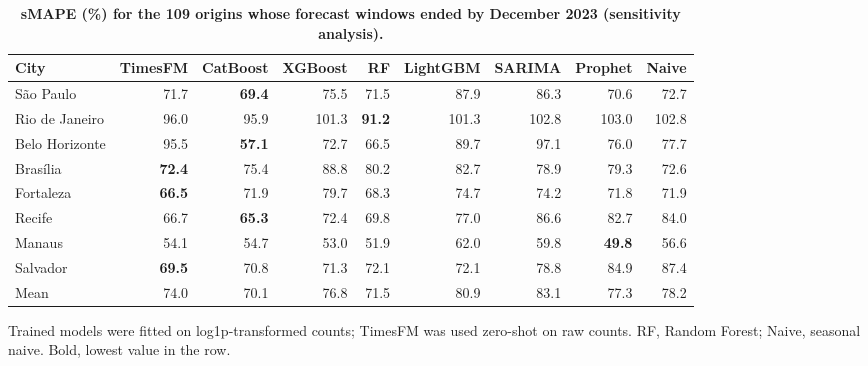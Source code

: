 \documentclass[10pt,letterpaper]{article}
\begin{document}
\begin{table}[!ht]
\centering
\small
\caption{\textbf{sMAPE (\%) for the 109 origins whose forecast windows ended by December 2023 (sensitivity analysis).}}
\begin{tabular}{lrrrrrrrr}
\toprule
City & TimesFM & CatBoost & XGBoost & RF & LightGBM & SARIMA & Prophet & Naive \\
\midrule
S\~ao Paulo & 71.7 & \textbf{69.4} & 75.5 & 71.5 & 87.9 & 86.3 & 70.6 & 72.7 \\
Rio de Janeiro & 96.0 & 95.9 & 101.3 & \textbf{91.2} & 101.3 & 102.8 & 103.0 & 102.8 \\
Belo Horizonte & 95.5 & \textbf{57.1} & 72.7 & 66.5 & 89.7 & 97.1 & 76.0 & 77.7 \\
Bras\'ilia & \textbf{72.4} & 75.4 & 88.8 & 80.2 & 82.7 & 78.9 & 79.3 & 72.6 \\
Fortaleza & \textbf{66.5} & 71.9 & 79.7 & 68.3 & 74.7 & 74.2 & 71.8 & 71.9 \\
Recife & 66.7 & \textbf{65.3} & 72.4 & 69.8 & 77.0 & 86.6 & 82.7 & 84.0 \\
Manaus & 54.1 & 54.7 & 53.0 & 51.9 & 62.0 & 59.8 & \textbf{49.8} & 56.6 \\
Salvador & \textbf{69.5} & 70.8 & 71.3 & 72.1 & 72.1 & 78.8 & 84.9 & 87.4 \\
\midrule
Mean & 74.0 & 70.1 & 76.8 & 71.5 & 80.9 & 83.1 & 77.3 & 78.2 \\
\bottomrule
\end{tabular}
\begin{flushleft} Trained models were fitted on log1p-transformed counts; TimesFM was used zero-shot on raw counts. RF, Random Forest; Naive, seasonal naive. Bold, lowest value in the row.
\end{flushleft}
\label{tabE}
\end{table}


\clearpage
\end{document}
